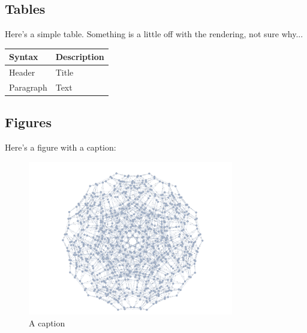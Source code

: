 \documentclass[11pt,letterpaper]{article}
\begin{document}
\subsection{Tables}
Here's a simple table. Something is a little off with the rendering, not sure why...
\begin{longtable}[]{@{}ll@{}}
    \hline
    Syntax & Description\tabularnewline
    \hline
    \endfirsthead
    Header & Title\tabularnewline
    Paragraph & Text\tabularnewline
    \hline
\end{longtable}

\subsection{Figures}
Here's a figure with a caption:
\begin{figure}
    \centering
    \includegraphics[width=0.8\textwidth]{fig1.pdf}
    \caption{A caption}
\end{figure}
\end{document}
